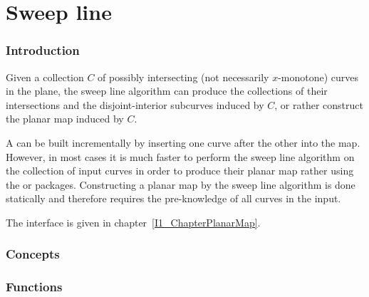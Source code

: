 \chapter{Sweep line}

\subsection*{Introduction}

Given a collection $C$ of possibly intersecting 
(not necessarily $x$-monotone) curves in the plane, 
the sweep line algorithm can produce the collections of their 
intersections and the disjoint-interior subcurves induced by $C$, or rather 
construct the planar map induced by $C$.

A  can be built incrementally by
inserting one curve after the other into the map. 
However, in most cases it is much faster to perform the sweep line algorithm on
the collection of input curves in order to produce their planar map 
rather using the  
or  packages.
Constructing a planar map by the sweep line algorithm is done statically and
therefore requires the pre-knowledge of all curves in the input.



The interface is given in chapter~\ref{I1_ChapterPlanarMap}.

\begin{ccTexOnly}

\subsection*{Concepts}

\subsection*{Functions}
\\
\\
\\

\end{ccTexOnly}    

